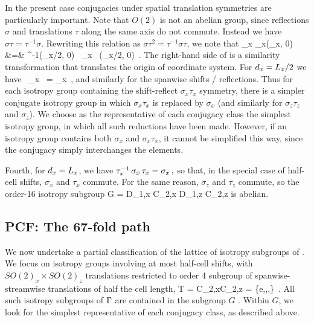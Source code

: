 In the present case conjugacies under spatial translation symmetries are
particularly important. Note that $O(2)$ is not an abelian group, since
reflections $\sigma$ and translations $\tau$ along the same axis do not
commute. Instead we have $\sigma \tau  = \tau^{-1} \sigma$.
Rewriting this relation as $\sigma \tau^{2} = \tau^{-1} \sigma \tau$, we
note that
\bea
\sigma_x \tau_x(\ell_x, 0)
  &=& \tau^{-1}(\ell_x/2, 0) \, \sigma_x \, \tau(\ell_x/2, 0)
\,.
\label{origShift}
\eea
The right-hand side of  is a similarity
transformation that translates the origin of coordinate system. For
$d_x = L_x/2$ we have
\beq
{} \, \sigma_{x} \, 
        = \sigma_{x} 
\label{origQuartShift}
\,,
\eeq
and similarly for the spanwise shifts / reflections. Thus for
each isotropy group containing the shift-reflect $\sigma_x \tau_x$
symmetry, there is a simpler conjugate isotropy group in which
$\sigma_x \tau_x$ is replaced by $\sigma_x$ (and similarly
for $\sigma_z \tau_z$ and $\sigma_z$). We choose as the representative
of each conjugacy class the simplest isotropy group, in which all such
reductions have been made. However, if an isotropy group contains both
$\sigma_x$ and $\sigma_x \tau_x$, it cannot be simplified this way,
since the conjugacy simply interchanges the elements.

Fourth, for $d_x = L_x$, we have
$\tau_{x}^{-1} \, \sigma_{x} \, \tau_{x} = \sigma_x \,,$
so that, in the special case of half-cell shifts,
$\sigma_x$ and $\tau_x$ commute. For the same reason,
$\sigma_z$ and $\tau_z$ commute, so the order-16 isotropy subgroup
\beq
G = D_{1,x} \times C_{2,x} \times D_{1,z} \times C_{2,z} \subset \GPCF
{}
is abelian.


\subsection{PCF: The 67-fold path}
\label{s:67-fold}

We now undertake a partial classification
of the lattice of isotropy subgroups of {\pCf}. We focus on
isotropy groups involving at most half-cell shifts, with $SO(2)_x \times SO(2)_z$
translations restricted to order 4 subgroup of spanwise-streamwise
translations  of half the cell length,
\beq
T = C_{2,x}\times C_{2,z}
  =  \{e,,,\}
\,.
\label{tauD2}
\eeq
All such isotropy subgroups of $\Gamma$ are contained
in the subgroup $G$  . Within $G$, we look for the
simplest representative of each conjugacy class, as described above.


